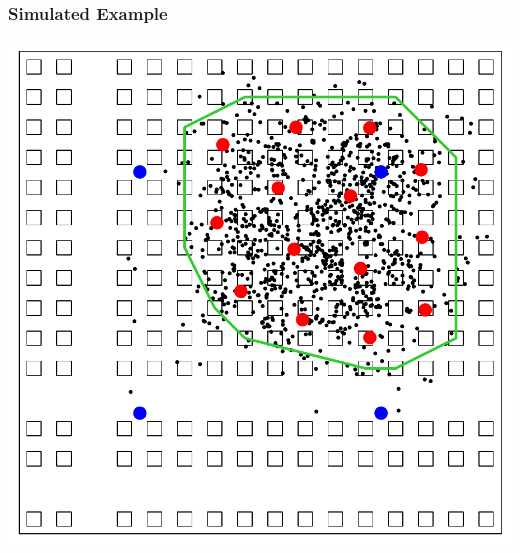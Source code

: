 \documentclass[mathserif,compress]{beamer}\usepackage{graphicx, color}
\makeatletter
\def\maxwidth{ %
  \ifdim\Gin@nat@width>\linewidth
    \linewidth
  \else
    \Gin@nat@width
  \fi
}
\makeatother
\begin{document}

\begin{frame}[fragile]
\frametitle{Simulated Example}




	\vspace{-.1cm}
	\begin{center}
	\includegraphics[width = .6\maxwidth]{figure/sim2-plot}
	\end{center}

\end{frame}
\end{document}
